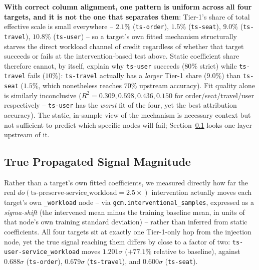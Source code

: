 \documentclass[journal, 10pt]{IEEEtran}
\begin{document}
\textbf{With correct column alignment, one pattern is uniform across all four targets, and it is not the one that separates them}: Tier-1's share of total effective scale is small everywhere -- $2.1\%$ (\texttt{ts-order}), $1.5\%$ (\texttt{ts-seat}), $9.0\%$ (\texttt{ts-travel}), $10.8\%$ (\texttt{ts-user}) -- so a target's own fitted mechanism structurally starves the direct workload channel of credit regardless of whether that target succeeds or fails at the intervention-based test above. Static coefficient share therefore cannot, by itself, explain why \texttt{ts-user} succeeds ($80\%$ strict) while \texttt{ts-travel} fails ($10\%$): \texttt{ts-travel} actually has a \emph{larger} Tier-1 share ($9.0\%$) than \texttt{ts-seat} ($1.5\%$, which nonetheless reaches $70\%$ upstream accuracy). Fit quality alone is similarly inconclusive ($R^2 = 0.309, 0.598, 0.436, 0.150$ for order/seat/travel/user respectively -- \texttt{ts-user} has the \emph{worst} fit of the four, yet the best attribution accuracy). The static, in-sample view of the mechanism is necessary context but not sufficient to predict which specific nodes will fail; Section~\ref{sec:propagation} looks one layer upstream of it.

\subsection{True Propagated Signal Magnitude}
\label{sec:propagation}
Rather than a target's own fitted coefficients, we measured directly how far the real $do(\text{ts-preserve-service\_workload}=2.5\times)$ intervention actually moves each target's own \texttt{\_workload} node -- via \texttt{gcm.interventional\_samples}, expressed as a \emph{sigma-shift} (the intervened mean minus the training baseline mean, in units of that node's own training standard deviation) -- rather than inferred from static coefficients. All four targets sit at exactly one Tier-1-only hop from the injection node, yet the true signal reaching them differs by close to a factor of two: \texttt{ts-user-service\_workload} moves $1.201\sigma$ ($+77.1\%$ relative to baseline), against $0.688\sigma$ (\texttt{ts-order}), $0.679\sigma$ (\texttt{ts-travel}), and $0.600\sigma$ (\texttt{ts-seat}).
\end{document}

